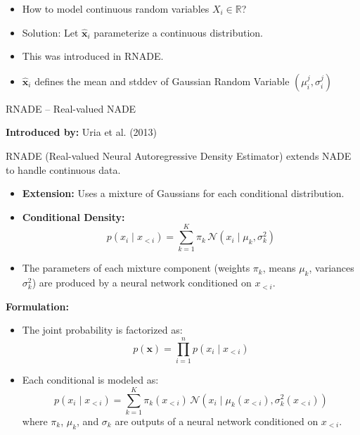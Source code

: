 \begin{frame}[allowframebreaks]{}
    \large
    \begin{itemize}
        \item How to model continuous random variables $X_i \in \mathbb{R}$?
        \item Solution: Let $\mathbf{\hat{x}}_i$ parameterize a continuous distribution.
        \item This was introduced in RNADE.
        \item $\mathbf{\hat{x}}_i$ defines the mean and stddev of Gaussian Random Variable $(\mu^j_i, \sigma^j_i)$
    \end{itemize}
\end{frame}

\begin{frame}[allowframebreaks]{RNADE – Real-valued NADE}

    \textbf{Introduced by:} Uria et al. (2013)

    \vspace{1em}
    RNADE (Real-valued Neural Autoregressive Density Estimator) extends NADE to handle continuous data.

    \begin{itemize}
        \item \textbf{Extension:} Uses a mixture of Gaussians for each conditional distribution.
        \item \textbf{Conditional Density:}
        \[
            p(x_i \mid x_{<i}) = \sum_{k=1}^K \pi_k \, \mathcal{N}(x_i \mid \mu_k, \sigma_k^2)
        \]
        \item The parameters of each mixture component (weights $\pi_k$, means $\mu_k$, variances $\sigma_k^2$) are produced by a neural network conditioned on $x_{<i}$.
    \end{itemize}

    \framebreak
    \textbf{Formulation:}
    \begin{itemize}
        \item The joint probability is factorized as:
        \[
            p(\mathbf{x}) = \prod_{i=1}^n p(x_i \mid x_{<i})
        \]
        \item Each conditional is modeled as:
        \[
            p(x_i \mid x_{<i}) = \sum_{k=1}^K \pi_k(x_{<i}) \, \mathcal{N}(x_i \mid \mu_k(x_{<i}), \sigma_k^2(x_{<i}))
        \]
        where $\pi_k$, $\mu_k$, and $\sigma_k$ are outputs of a neural network conditioned on $x_{<i}$.
    \end{itemize}


\end{frame}
